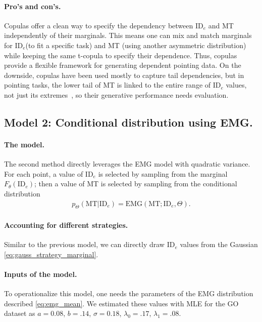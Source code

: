 \documentclass[acmlarge, manuscript,review]{acmart}
\newcommand{\mt}{\ensuremath{{\text{MT}}}\xspace}
\newcommand{\ide}{\ensuremath{{\text{ID}_e}}\xspace}
\begin{document}
\paragraph{Pro's and con's.} Copulas offer a clean way to specify the dependency between \ide and MT independently of their marginals. This means one can mix and match marginals for \ide (\eg to fit a specific task) and MT (\eg using another asymmetric distribution) while keeping the same t-copula to specify their dependence. Thus, copulas provide a flexible framework for generating dependent pointing data.
On the downside, copulas have been used mostly to capture tail dependencies, but in pointing tasks, the lower tail of MT is linked to the entire range of \ide values, not just its extremes~\cite{gori2018tochi}, so their generative performance needs evaluation. 



\subsection{Model 2: Conditional distribution using EMG.}
\paragraph{The model.} The second method directly leverages the EMG model with quadratic variance. For each point, a value of $\ide$ is selected by sampling from the marginal $F_{\theta}(\ide)$; then a value of MT is selected by sampling from the conditional distribution
\begin{align}
	p_{\Theta}(\mt|\ide) = \text{EMG}(\mt; \ide, \Theta).
\end{align}

\paragraph{Accounting for different strategies.} Similar to the previous model, we can directly draw \ide values from the Gaussian \autoref{eq:gauss_strategy_marginal}.%

\paragraph{Inputs of the model.} To operationalize this model, one needs the parameters of the EMG distribution described \autoref{eq:emg_mean}. We estimated these values with MLE for the GO dataset as $a = 0.08$, $b = .14$, $\sigma=0.18$, $\lambda_0 = .17$, $\lambda_1 = .08$. 
\end{document}

